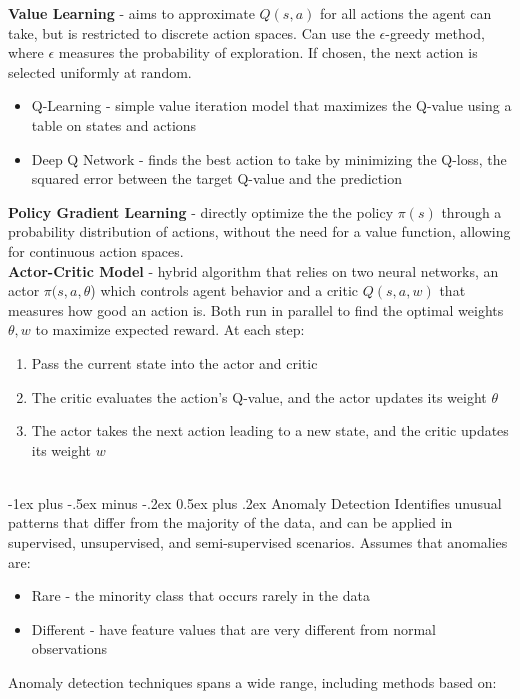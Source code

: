 \documentclass[10pt,landscape]{article}
\makeatletter
\renewcommand{\section}{\@startsection{section}{1}{0mm}%
                                {-1ex plus -.5ex minus -.2ex}%
                                {0.5ex plus .2ex}%
                                {\normalfont\large\bfseries}}
\makeatother
\begin{document}
\begin{multicols}{3}
\textbf{Value Learning} - aims to approximate $Q(s,a)$ for all actions the agent can take, but is restricted to discrete action spaces. Can use the $\epsilon$-greedy method, where $\epsilon$ measures the probability of exploration. If chosen, the next action is selected uniformly at random.
\begin{itemize}[label={--},leftmargin=4mm]
\itemsep -.4mm 
\item Q-Learning - simple value iteration model that maximizes the Q-value using a table on states and actions
\item Deep Q Network - finds the best action to take by minimizing the Q-loss, the squared error between the target Q-value and the prediction 
\end{itemize}

\textbf{Policy Gradient Learning} - directly optimize the the policy $\pi(s)$ through a probability distribution of actions, without the need for a value function, allowing for continuous action spaces.  \\
\smallskip
\textbf{Actor-Critic Model} - hybrid algorithm that relies on two neural networks, an actor $\pi(s,a,\theta$) which controls agent behavior  and a critic $Q(s,a,w)$ that measures how good an action is. Both run in parallel to find the optimal weights $\theta, w$ to maximize expected reward. At each step:
\begin{enumerate}[leftmargin=5mm]
\itemsep -.4mm 
\item Pass the current state into the actor and critic
\item The critic evaluates the action's Q-value, and the actor updates its weight $\theta$
\item The actor takes the next action leading to a new state, and the critic updates its weight $w$ 
\end{enumerate}
\columnbreak

\textcolor{white}{.}\vspace{-3mm}\\ %
\section{Anomaly Detection} 
Identifies unusual patterns that differ from the majority of the data, and can be applied in supervised, unsupervised, and semi-supervised scenarios. Assumes that anomalies are:
\begin{itemize}[label={--},leftmargin=4mm]
\itemsep -.4mm 
\item Rare - the minority class that occurs rarely in the data
\item Different - have feature values that are very different from normal observations
\end{itemize}
\smallskip
Anomaly detection techniques spans a wide range, including methods based on:


\end{multicols}
\end{document}
